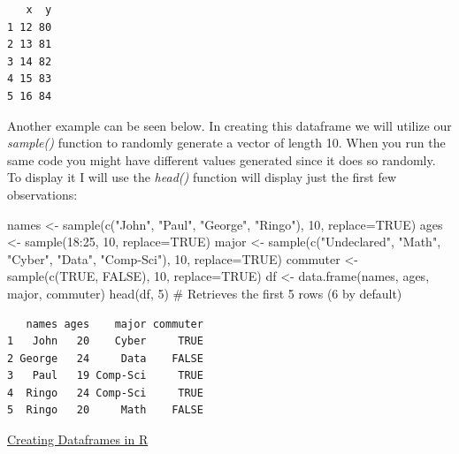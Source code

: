 \documentclass[
  letterpaper,
  DIV=11,
  numbers=noendperiod]{scrreprt}
\newenvironment{Shaded}{\begin{snugshade}}{\end{snugshade}}
\newcommand{\AttributeTok}[1]{\textcolor[rgb]{0.40,0.45,0.13}{#1}}
\newcommand{\CommentTok}[1]{\textcolor[rgb]{0.37,0.37,0.37}{#1}}
\newcommand{\ConstantTok}[1]{\textcolor[rgb]{0.56,0.35,0.01}{#1}}
\newcommand{\DecValTok}[1]{\textcolor[rgb]{0.68,0.00,0.00}{#1}}
\newcommand{\FunctionTok}[1]{\textcolor[rgb]{0.28,0.35,0.67}{#1}}
\newcommand{\NormalTok}[1]{\textcolor[rgb]{0.00,0.23,0.31}{#1}}
\newcommand{\OtherTok}[1]{\textcolor[rgb]{0.00,0.23,0.31}{#1}}
\newcommand{\SpecialCharTok}[1]{\textcolor[rgb]{0.37,0.37,0.37}{#1}}
\newcommand{\StringTok}[1]{\textcolor[rgb]{0.13,0.47,0.30}{#1}}
\begin{document}
\begin{verbatim}
   x  y
1 12 80
2 13 81
3 14 82
4 15 83
5 16 84
\end{verbatim}

Another example can be seen below. In creating this dataframe we will
utilize our \emph{sample()} function to randomly generate a vector of
length 10. When you run the same code you might have different values
generated since it does so randomly. To display it I will use the
\emph{head()} function will display just the first few observations:

\begin{Shaded}
\begin{Highlighting}[]
\NormalTok{names }\OtherTok{\textless{}{-}} \FunctionTok{sample}\NormalTok{(}\FunctionTok{c}\NormalTok{(}\StringTok{"John"}\NormalTok{, }\StringTok{"Paul"}\NormalTok{, }\StringTok{"George"}\NormalTok{, }\StringTok{"Ringo"}\NormalTok{), }\DecValTok{10}\NormalTok{, }\AttributeTok{replace=}\ConstantTok{TRUE}\NormalTok{)}
\NormalTok{ages }\OtherTok{\textless{}{-}} \FunctionTok{sample}\NormalTok{(}\DecValTok{18}\SpecialCharTok{:}\DecValTok{25}\NormalTok{, }\DecValTok{10}\NormalTok{, }\AttributeTok{replace=}\ConstantTok{TRUE}\NormalTok{)}
\NormalTok{major }\OtherTok{\textless{}{-}} \FunctionTok{sample}\NormalTok{(}\FunctionTok{c}\NormalTok{(}\StringTok{"Undeclared"}\NormalTok{, }\StringTok{"Math"}\NormalTok{, }\StringTok{"Cyber"}\NormalTok{, }\StringTok{"Data"}\NormalTok{, }\StringTok{"Comp{-}Sci"}\NormalTok{), }\DecValTok{10}\NormalTok{, }\AttributeTok{replace=}\ConstantTok{TRUE}\NormalTok{)}
\NormalTok{commuter }\OtherTok{\textless{}{-}} \FunctionTok{sample}\NormalTok{(}\FunctionTok{c}\NormalTok{(}\ConstantTok{TRUE}\NormalTok{, }\ConstantTok{FALSE}\NormalTok{), }\DecValTok{10}\NormalTok{, }\AttributeTok{replace=}\ConstantTok{TRUE}\NormalTok{)}
\NormalTok{df }\OtherTok{\textless{}{-}} \FunctionTok{data.frame}\NormalTok{(names, ages, major, commuter)}
\FunctionTok{head}\NormalTok{(df, }\DecValTok{5}\NormalTok{) }\CommentTok{\# Retrieves the first 5 rows (6 by default)}
\end{Highlighting}
\end{Shaded}

\begin{verbatim}
   names ages    major commuter
1   John   20    Cyber     TRUE
2 George   24     Data    FALSE
3   Paul   19 Comp-Sci     TRUE
4  Ringo   24 Comp-Sci     TRUE
5  Ringo   20     Math    FALSE
\end{verbatim}

\begin{watch}{}{}
    \href{https://youtu.be/KjMZt7-YDVQ}{Creating Dataframes in R}
\end{watch}
\end{document}
